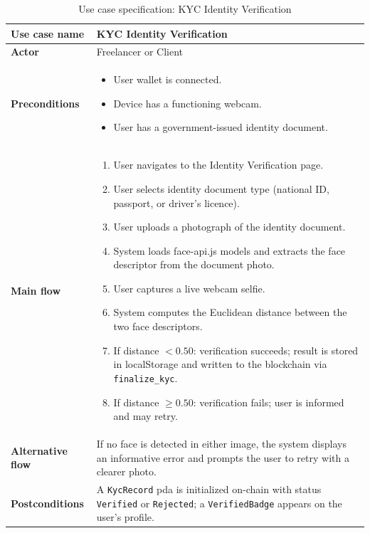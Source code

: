 \begin{table}[H]
\centering
\caption{Use case specification: KYC Identity Verification}
\label{table:uc03}
\begin{tabular}{|l|p{10cm}|}
\hline
\textbf{Use case name} & KYC Identity Verification \\ \hline
\textbf{Actor} & Freelancer or Client \\ \hline
\textbf{Preconditions} & \begin{itemize}[noitemsep]
    \item User wallet is connected.
    \item Device has a functioning webcam.
    \item User has a government-issued identity document.
\end{itemize} \\ \hline
\textbf{Main flow} & \begin{enumerate}[noitemsep]
    \item User navigates to the Identity Verification page.
    \item User selects identity document type (national ID, passport, or driver's licence).
    \item User uploads a photograph of the identity document.
    \item System loads face-api.js models and extracts the face descriptor from the document photo.
    \item User captures a live webcam selfie.
    \item System computes the Euclidean distance between the two face descriptors.
    \item If distance $< 0.50$: verification succeeds; result is stored in localStorage and written to the blockchain via \texttt{finalize\_kyc}.
    \item If distance $\geq 0.50$: verification fails; user is informed and may retry.
\end{enumerate} \\ \hline
\textbf{Alternative flow} & If no face is detected in either image, the system displays an informative error and prompts the user to retry with a clearer photo. \\ \hline
\textbf{Postconditions} & A \texttt{KycRecord} \gls{pda} is initialized on-chain with status \texttt{Verified} or \texttt{Rejected}; a \texttt{VerifiedBadge} appears on the user's profile. \\ \hline
\end{tabular}
\end{table}

